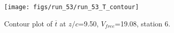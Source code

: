 \begin{figure}[H]
\centering
\texttt{[image: figs/run\_53/run\_53\_T\_contour]}
\caption{Contour plot of $\overline{t}$ at $z/c$=9.50, $V_{free}$=19.08, station 6.}
\end{figure}



